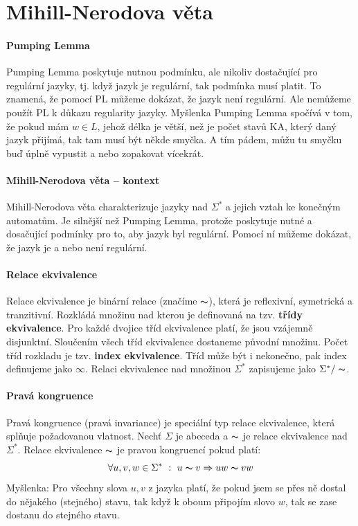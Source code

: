 
\section{Mihill-Nerodova věta}

\paragraph*{Pumping Lemma} Pumping Lemma poskytuje nutnou podmínku, ale nikoliv dostačující pro regulární jazyky, tj. když jazyk je regulární, tak podmínka musí platit. To znamená, že pomocí PL můžeme dokázat, že jazyk není regulární. Ale nemůžeme použít PL k důkazu regularity jazyky. Myšlenka Pumping Lemma spočívá v tom, že pokud mám $w \in L$, jehož délka je větší, než je počet stavů KA, který daný jazyk přijímá, tak tam musí být někde smyčka. A tím pádem, můžu tu smyčku buď úplně vypustit a nebo zopakovat vícekrát.

\paragraph*{Mihill-Nerodova věta -- kontext} Mihill-Nerodova věta charakterizuje jazyky nad $\Sigma^*$ a jejich vztah ke konečným automatům. Je silnější než Pumping Lemma, protože poskytuje nutné a dosačující podmínky pro to, aby jazyk byl regulární. Pomocí ní můžeme dokázat, že jazyk je a nebo není regulární.

\paragraph*{Relace ekvivalence} Relace ekvivalence je binární relace (značíme $\thicksim$), která je reflexivní, symetrická a tranzitivní. Rozkládá množinu nad kterou je definovaná na tzv. \textbf{třídy ekvivalence}. Pro každé dvojice tříd ekvivalence platí, že jsou vzájemně disjunktní. Sloučením všech tříd ekvivalence dostaneme původní množinu. Počet tříd rozkladu je tzv. \textbf{index ekvivalence}. Tříd může být i nekonečno, pak index definujeme jako $\infty$. Relaci ekvivalence nad množinou $\Sigma^*$ zapisujeme jako $\Sigma^* / \thicksim$.

\paragraph*{Pravá kongruence} Pravá kongruence (pravá invariance) je speciální typ relace ekvivalence, která splňuje požadovanou vlatnost. Nechť $\Sigma$ je abeceda a $\thicksim$ je relace ekvivalence nad $\Sigma^*$. Relace ekvivalence $\thicksim$ je pravou kongruencí pokud platí: $$ \forall u, v, w \in \Sigma^* ~:~ u \thicksim v \Rightarrow uw \thicksim vw $$
Myšlenka: Pro všechny slova $u, v$ z jazyka platí, že pokud jsem se přes ně dostal do nějakého (stejného) stavu, tak když k oboum připojím slovo $w$, tak se zase dostanu do stejného stavu.

